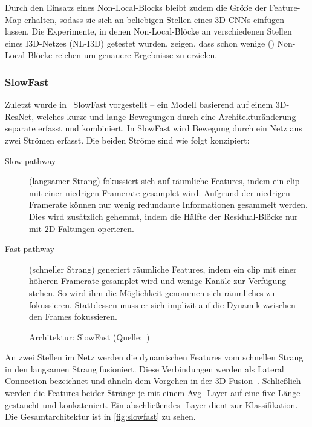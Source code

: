 Durch den Einsatz eines Non-Local-Blocks bleibt zudem die Größe der Feature-Map erhalten, sodass sie sich an beliebigen Stellen eines 3D-CNNs einfügen lassen.
Die Experimente, in denen Non-Local-Blöcke an verschiedenen Stellen eines I3D-Netzes (NL-I3D) getestet wurden, zeigen, dass schon wenige () Non-Local-Blöcke reichen um genauere Ergebnisse zu erzielen.

\subsubsection*{SlowFast}

Zuletzt wurde in~\cite{Feichtenhofer18} SlowFast vorgestellt -- ein Modell basierend auf einem 3D-ResNet, welches kurze und lange Bewegungen durch eine Architekturänderung separate erfasst und kombiniert.
In SlowFast wird Bewegung durch ein Netz aus zwei Strömen erfasst.
Die beiden Ströme sind wie folgt konzipiert:

\begin{description}
    \item[Slow pathway]
    (langsamer Strang) fokussiert sich auf räumliche Features, indem ein \gls{clip} mit einer niedrigen Framerate gesamplet wird.
    Aufgrund der niedrigen Framerate können nur wenig redundante Informationen gesammelt werden.
    Dies wird zusätzlich gehemmt, indem die Hälfte der Residual-Blöcke nur mit 2D-Faltungen operieren.
    \item[Fast pathway]
    (schneller Strang) generiert räumliche Features, indem ein \gls{clip} mit einer höheren Framerate gesamplet wird und wenige Kanäle zur Verfügung stehen.
    So wird ihm die Möglichkeit genommen sich räumliches zu fokussieren.
    Stattdessen muss er sich implizit auf die Dynamik zwischen den Frames fokussieren.
\end{description}

\begin{figure}[h!]
    \centering
    \caption{Architektur: SlowFast (Quelle:~\cite{Feichtenhofer18})}
    \label{fig:slowfast}
\end{figure}

An zwei Stellen im Netz werden die dynamischen Features vom schnellen Strang in den langsamen Strang fusioniert.
Diese Verbindungen werden als Lateral Connection bezeichnet und ähneln dem Vorgehen in der 3D-Fusion~\cite{Feichtenhofer16}.
Schließlich werden die Features beider Stränge je mit einem Avg-\pool-Layer auf eine fixe Länge gestaucht und konkateniert.
Ein abschließendes \fc-Layer dient zur Klassifikation.
Die Gesamtarchitektur ist in \autoref{fig:slowfast} zu sehen.

